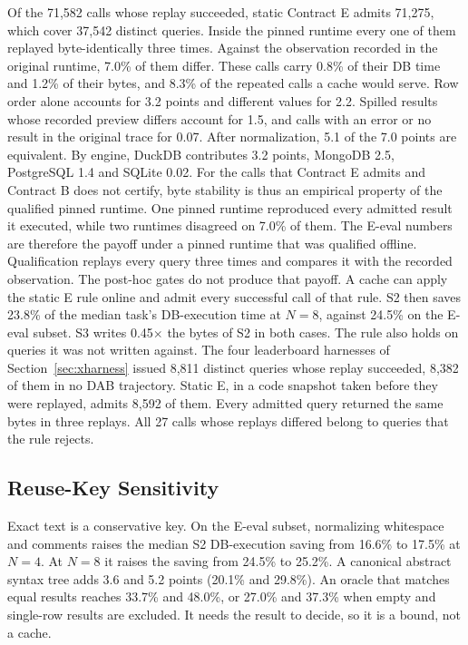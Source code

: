 Of the 71,582 calls whose replay succeeded, static Contract E admits 71,275, which cover 37,542 distinct queries.
Inside the pinned runtime every one of them replayed byte-identically three times. Against the observation recorded
in the original runtime, 7.0\% of them differ. These calls carry 0.8\% of their DB time and 1.2\% of their bytes,
and 8.3\% of the repeated calls a cache would serve. Row order alone accounts for 3.2 points and different values
for 2.2. Spilled results whose recorded preview differs account for 1.5, and calls with an error or no result in the
original trace for 0.07. After normalization, 5.1 of the 7.0 points are equivalent. By engine, DuckDB contributes 3.2
points, MongoDB 2.5, PostgreSQL 1.4 and SQLite 0.02. For the calls that Contract E admits and Contract B does not
certify, byte stability is thus an empirical property of the qualified pinned runtime. One pinned runtime reproduced
every admitted result it executed, while two runtimes disagreed on 7.0\% of them. The E-eval numbers are therefore
the payoff under a pinned runtime that was qualified offline. Qualification replays every query three times and
compares it with the recorded observation. The post-hoc gates do not produce that payoff. A cache can apply the
static E rule online and admit every successful call of that rule. S2 then saves 23.8\% of the median task's
DB-execution time at $N=8$, against 24.5\% on the E-eval subset. S3 writes 0.45$\times$ the bytes of S2 in both
cases. The rule also holds on queries it was not written against. The four leaderboard harnesses of
Section~\ref{sec:xharness} issued 8,811 distinct queries whose replay succeeded, 8,382 of them in no DAB trajectory.
Static E, in a code snapshot taken before they were replayed, admits 8,592 of them. Every admitted query returned
the same bytes in three replays. All 27 calls whose replays differed belong to queries that the rule rejects.

\subsection{Reuse-Key Sensitivity}
\label{sec:keys}

Exact text is a conservative key. On the E-eval subset, normalizing whitespace and comments raises the median S2 DB-execution saving from 16.6\% to 17.5\% at $N=4$. At $N=8$ it raises the saving from 24.5\% to 25.2\%. A canonical abstract syntax
tree adds 3.6 and 5.2 points (20.1\% and 29.8\%). An oracle that matches equal results reaches 33.7\% and 48.0\%, or
27.0\% and 37.3\% when empty and single-row results are excluded. It needs the result to decide, so it is a bound,
not a cache.
